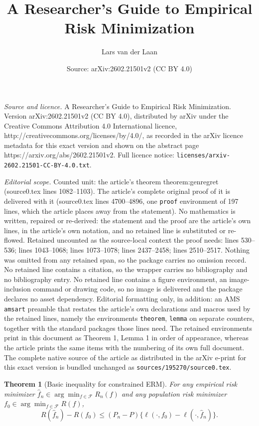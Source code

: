 \documentclass[10pt,a4paper]{amsart}
\title{A Researcher’s Guide to Empirical Risk Minimization}
\author{Lars van der Laan}
\date{Source: arXiv:2602.21501v2 (CC BY 4.0)}
\newtheorem{theorem}{Theorem}
\begin{document}
\maketitle

\noindent\emph{Source and licence.} A Researcher’s Guide to Empirical Risk Minimization. Version arXiv:2602.21501v2 (CC BY 4.0), distributed by arXiv under the Creative Commons Attribution 4.0 International licence, http://creativecommons.org/licenses/by/4.0/, as recorded in the arXiv licence metadata for this exact version and shown on the abstract page https://arxiv.org/abs/2602.21501v2. Full licence notice: \texttt{licenses/arxiv-2602.21501-CC-BY-4.0.txt}.\par\smallskip

\noindent\textit{Editorial scope.} Counted unit: the article's theorem theorem:genregret (source0.tex lines 1082--1103). The article's complete original proof of it is delivered with it (source0.tex lines 4700--4896, one \texttt{proof} environment of 197 lines, which the article places away from the statement). No mathematics is written, repaired or re-derived: the statement and the proof are the article's own lines, in the article's own notation, and no retained line is substituted or re-flowed.  Retained uncounted as the source-local context the proof needs: lines 530--536; lines 1043--1068; lines 1073--1078; lines 2437--2458; lines 2510--2517.  Nothing was omitted from any retained span, so the package carries no omission record.  No retained line contains a citation, so the wrapper carries no bibliography and no bibliography entry.  No retained line contains a figure environment, an image-inclusion command or drawing code, so no image is delivered and the package declares no asset dependency.  Editorial formatting only, in addition: an AMS \texttt{amsart} preamble that restates the article's own declarations and macros used by the retained lines, namely the environments \texttt{theorem}, \texttt{lemma} on separate counters, together with the standard packages those lines need.  The retained environments print in this document as Theorem 1, Lemma 1 in order of appearance, whereas the article prints the same items with the numbering of its own full document.  The complete native source of the article as distributed in the arXiv e-print for this exact version is bundled unchanged as \texttt{sources/195270/source0.tex}.
\begin{theorem}[Basic inequality for constrained ERM]
\label{theorem::basic}
For any empirical risk minimizer $\hat f_n\in\arg\min_{f\in\mathcal F} R_n(f)$ and any population risk minimizer $f_0\in\arg\min_{f\in\mathcal F} R(f)$,
\[
R(\hat f_n)-R(f_0) \le (P_n-P)\bigl\{\ell(\cdot,f_0)-\ell(\cdot,\hat f_n)\bigr\}.
\]
\end{theorem}
\end{document}
